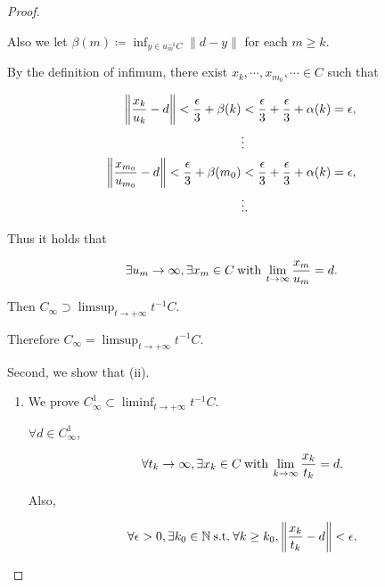 \documentclass[a4paper,11pt]{jsarticle}
\newcommand{\NaturalNumberSet}{\mathbb{N}}
\newcommand{\SuchThat}{\:\text{s.t.}\:}
\begin{document}
\begin{proof}
\begin{enumerate}[label=i-\alph*,align=CenterWithParen]
      Also we let $\beta(m) \coloneqq \inf_{y \in u_m^{-1}C} \left\lVert d - y \right\rVert$ for each $m \geq k$.

      By the definition of infimum, there exist $x_k, \cdots, x_{m_0}, \cdots \in C$ such that

      \begin{equation}
        \begin{split}
          \left\lVert \frac{x_k}{u_k} - d \right\rVert  < \frac{\epsilon}{3} + \beta(k) &< \frac{\epsilon}{3} + \frac{\epsilon}{3} + \alpha(k) = \epsilon, \\
          &\vdots  \\
          \left\lVert \frac{x_{m_0}}{u_{m_0}} - d \right\rVert  < \frac{\epsilon}{3} + \beta(m_0) &< \frac{\epsilon}{3} + \frac{\epsilon}{3} + \alpha(k) = \epsilon, \\
          &\vdots. \notag
        \end{split}
      \end{equation}

      Thus it holds that

      \begin{equation}
        \exists u_m \to \infty, \exists x_m \in C \:\text{with}\: \lim_{t \to \infty} \frac{x_m}{u_m} = d. \notag
      \end{equation}

      Then $C_{\infty} \supset \limsup_{t \to + \infty} t^{-1}C$.

  \end{enumerate}

  Therefore $C_{\infty} = \limsup_{t \to + \infty} t^{-1}C$.

  Second, we show that (ii).

  \begin{enumerate}[label=ii-\alph*,align=CenterWithParen2]
    \item We prove $C_{\infty}^{1} \subset \liminf_{t \to + \infty} t^{-1}C$.

    $\forall d \in C_{\infty}^{1}$,

    \begin{equation}
      \forall t_k \rightarrow \infty, \exists x_k \in C \:\text{with}\: \lim_{k \to \infty} \frac{x_k}{t_k} = d. \notag
    \end{equation}

    Also,

    \begin{equation}
      \forall \epsilon > 0, \exists k_0 \in \NaturalNumberSet \SuchThat \forall k \geq k_0, \left\lVert \frac{x_k}{t_k} - d \right\rVert < \epsilon. \notag
    \end{equation}


\end{enumerate}
\end{proof}
\end{document}
